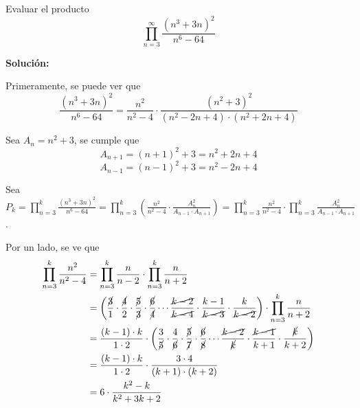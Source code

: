 \documentclass[../../main.tex]{subfiles}
\begin{document}
  \begin{shaded}
    Evaluar el producto
    $$
    \prod_{n = 3}^\infty \frac{(n^3 + 3n)^2}{n^6 - 64}
    $$
  \end{shaded}

  \textbf{Solución:}

  Primeramente, se puede ver que
  $$
  \frac{(n^3 + 3n)^2}{n^6 - 64} = \frac{n^2}{n^2 - 4} \cdot \frac{(n^2 + 3)^2}{(n^2 - 2n + 4) \cdot (n^2 + 2n + 4)}
  $$

  Sea $A_n = n^2 + 3$, se cumple que
  $$
  A_{n + 1} = (n + 1)^2 + 3 = n^2 + 2n + 4
  $$
  $$
  A_{n - 1} = (n - 1)^2 + 3 = n^2 - 2n + 4
  $$

  Sea $P_k = \displaystyle\prod_{n = 3}^k \displaystyle\frac{(n^3 + 3n)^2}{n^6 - 64} = \displaystyle\prod_{n = 3}^k \left(\displaystyle\frac{n^2}{n^2 - 4} \cdot \displaystyle\frac{A_n^2}{A_{n - 1} \cdot A_{n + 1}}\right) = \displaystyle\prod_{n = 3}^k \displaystyle\frac{n^2}{n^2 - 4} \cdot \displaystyle\prod_{n = 3}^k \displaystyle\frac{A_n^2}{A_{n - 1} \cdot A_{n + 1}}$.

  Por un lado, se ve que
  \begin{equation*}
    \begin{split}
      \prod_{n = 3}^k \frac{n^2}{n^2 - 4} & = 
      \prod_{n = 3}^k \frac{n}{n - 2} \cdot \prod_{n = 3}^k \frac{n}{n + 2} \\ & = 
      \left(\frac{\cancel{3}}{1} \cdot \frac{\cancel{4}}{2} \cdot \frac{\cancel{5}}{\cancel{3}} \cdot \frac{\cancel{6}}{\cancel{4}} \cdots \frac{\cancel{k - 2}}{\cancel{k - 4}} \cdot \frac{k - 1}{\cancel{k - 3}} \cdot \frac{k}{\cancel{k - 2}} \right) \cdot \prod_{n = 3}^k \frac{n}{n + 2} \\ & =
      \frac{(k - 1) \cdot k}{1 \cdot 2} \cdot \left(\frac{3}{\cancel{5}} \cdot \frac{4}{\cancel{6}} \cdot \frac{\cancel{5}}{\cancel{7}} \cdot \frac{\cancel{6}}{\cancel{8}} \cdots \frac{\cancel{k - 2}}{\cancel{k}} \cdot \frac{\cancel{k - 1}}{k + 1} \cdot \frac{\cancel{k }}{k + 2} \right) \\ & =
      \frac{(k - 1) \cdot k}{1 \cdot 2} \cdot \frac{3 \cdot 4}{(k + 1) \cdot (k + 2)} \\ & =
      6 \cdot \frac{k^2 - k}{k^2 + 3k + 2}
    \end{split}
  \end{equation*}
\end{document}
